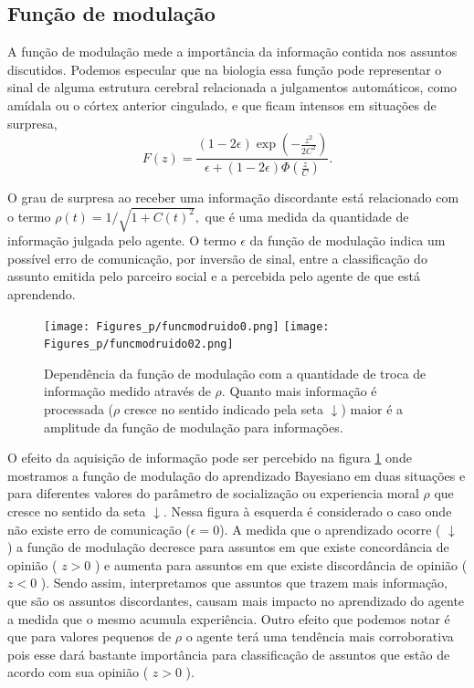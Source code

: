 \subsection{Função de modulação} %
\label{sec:fmod}

A função de modulação mede a importância da informação contida nos
assuntos discutidos. Podemos especular que na biologia essa função  pode
representar o sinal de alguma estrutura cerebral relacionada a julgamentos
automáticos, como amídala ou o córtex anterior cingulado, e que ficam
intensos em situações de surpresa,
\begin{equation}
F(z) = \frac{(1 - 2\epsilon)\exp\left(-\frac{z^2}{2C^2}\right)}
        {\epsilon + (1 - 2\epsilon)\Phi\left(\frac{z}{C}\right)}.
\label{eq:F}
\end{equation}

O grau de surpresa ao receber uma informação discordante está relacionado
com o termo $\rho(t) = 1/\sqrt{1 + C(t)^2},$ que é uma medida da quantidade de
informação julgada pelo agente. O termo $\epsilon$ da função de modulação
indica um possível erro de comunicação, por inversão de sinal, entre a
classificação do assunto emitida pelo parceiro social e a percebida pelo
agente de que está aprendendo.

\begin{figure}
\centering
\caption{
Dependência da função de modulação com a quantidade de troca de
informação medido através de $\rho$. Quanto mais informação é processada
($\rho$ cresce no sentido indicado pela seta $\downarrow$) maior é a amplitude
da função de modulação para informações.
}
\texttt{[image: Figures\_p/funcmodruido0.png]}
\texttt{[image: Figures\_p/funcmodruido02.png]}
\label{fig:fmod}
\end{figure}

O efeito da aquisição de informação pode ser percebido na figura
\ref{fig:fmod} onde mostramos a função de modulação do aprendizado
Bayesiano em duas situações e para diferentes valores do parâmetro de
socialização ou experiencia moral $\rho$ que cresce no sentido da seta
$\downarrow$. Nessa figura à esquerda é considerado o caso onde não existe
erro de comunicação ($\epsilon = 0$). A medida que o aprendizado ocorre
( $\downarrow$ ) a função de modulação decresce para assuntos em que
existe concordância de opinião ( $z > 0$ ) e aumenta para assuntos em que
existe discordância de opinião ( $z < 0$ ).  Sendo assim, interpretamos que
assuntos que trazem mais informação, que são os assuntos discordantes,
causam mais impacto no aprendizado do agente a medida que o mesmo acumula
experiência. Outro efeito que podemos notar é que para valores pequenos
de $\rho$ o agente terá uma tendência mais corroborativa pois esse dará
bastante importância para classificação de assuntos que estão de acordo
com sua opinião ( $z>0$ ).

